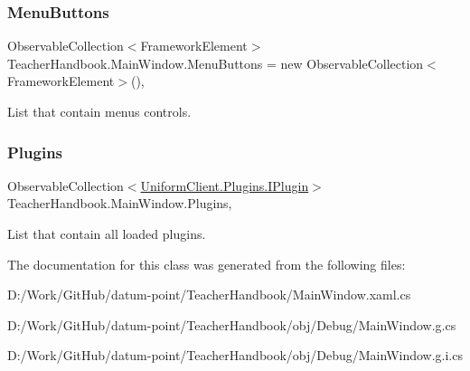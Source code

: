 \subsubsection{\texorpdfstring{Menu\+Buttons}{MenuButtons}}
{\footnotesize\ttfamily Observable\+Collection$<$Framework\+Element$>$ Teacher\+Handbook.\+Main\+Window.\+Menu\+Buttons = new Observable\+Collection$<$Framework\+Element$>$()\hspace{0.3cm}{\ttfamily [get]}, {\ttfamily [set]}}



List that contain menu\textquotesingle{}s controls. 

\mbox{\label{class_teacher_handbook_1_1_main_window_a86e1ee1d12e39fbbd0bc0d7f32e36ad0}} 
\subsubsection{\texorpdfstring{Plugins}{Plugins}}
{\footnotesize\ttfamily Observable\+Collection$<$\mbox{\hyperlink{interface_uniform_client_1_1_plugins_1_1_i_plugin}{Uniform\+Client.\+Plugins.\+I\+Plugin}}$>$ Teacher\+Handbook.\+Main\+Window.\+Plugins\hspace{0.3cm}{\ttfamily [get]}, {\ttfamily [set]}}



List that contain all loaded plugins. 



The documentation for this class was generated from the following files\+:\begin{DoxyCompactItemize}
\item 
D\+:/\+Work/\+Git\+Hub/datum-\/point/\+Teacher\+Handbook/Main\+Window.\+xaml.\+cs\item 
D\+:/\+Work/\+Git\+Hub/datum-\/point/\+Teacher\+Handbook/obj/\+Debug/Main\+Window.\+g.\+cs\item 
D\+:/\+Work/\+Git\+Hub/datum-\/point/\+Teacher\+Handbook/obj/\+Debug/Main\+Window.\+g.\+i.\+cs\end{DoxyCompactItemize}

